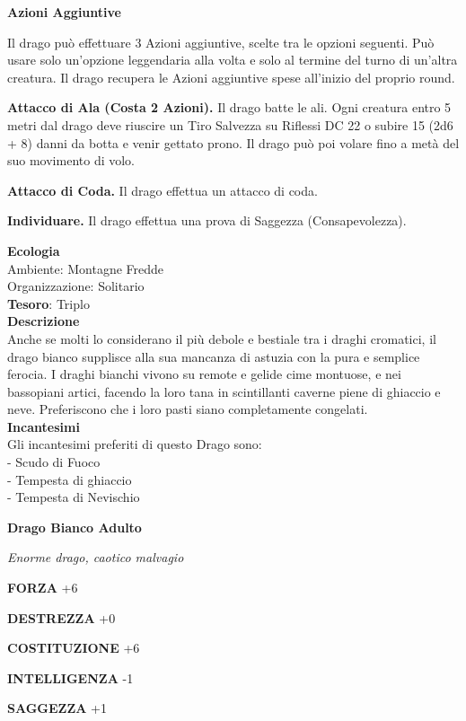\begin{multicols}{2}
	\textbf{Azioni Aggiuntive}

	Il drago può effettuare 3 Azioni aggiuntive, scelte tra le opzioni seguenti. Può usare solo un'opzione leggendaria alla volta e solo al termine del turno di un'altra creatura. Il drago recupera le Azioni aggiuntive spese all'inizio del proprio round.

	\textbf{Attacco di Ala (Costa 2 Azioni).} Il drago batte le ali. Ogni creatura entro 5 metri dal drago deve riuscire un Tiro Salvezza su Riflessi DC 22 o subire 15 (2d6 + 8) danni da botta e venir gettato prono. Il drago può poi volare fino a metà del suo movimento di volo.

	\textbf{Attacco di Coda.} Il drago effettua un attacco di coda.

	\textbf{Individuare.} Il drago effettua una prova di Saggezza (Consapevolezza).

	\textbf{Ecologia}\\
	Ambiente: Montagne Fredde\\
	Organizzazione: Solitario\\
	\textbf{Tesoro}: Triplo\\
	\textbf{Descrizione}\\
	Anche se molti lo considerano il più debole e bestiale tra i draghi cromatici, il drago bianco supplisce alla sua mancanza di astuzia con la pura e semplice ferocia. I draghi bianchi vivono su remote e gelide cime montuose, e nei bassopiani artici, facendo la loro tana in scintillanti caverne piene di ghiaccio e neve. Preferiscono che i loro pasti siano completamente congelati.\\

	\textbf{Incantesimi}\\
	Gli incantesimi preferiti di questo Drago sono:\\
	- Scudo di Fuoco\\
	- Tempesta di ghiaccio\\
	- Tempesta di Nevischio


	\medskip{}\textbf{Drago Bianco Adulto}

	\textit{Enorme drago, caotico malvagio}

	\textbf{FORZA} +6

	\textbf{DESTREZZA} +0

	\textbf{COSTITUZIONE} +6

	\textbf{INTELLIGENZA} -1

	\textbf{SAGGEZZA} +1


\end{multicols}
